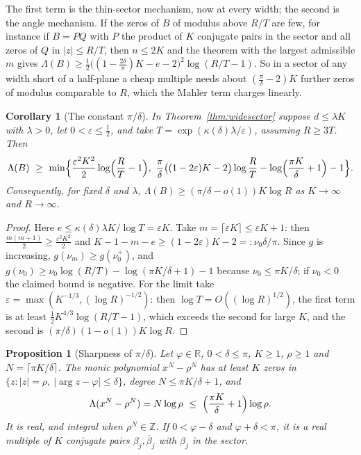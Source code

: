 \documentclass[11pt]{article}
\newtheorem{corollary}[theorem]{Corollary}
\newtheorem{proposition}[theorem]{Proposition}
\newcommand{\R}{\mathbb R}
\begin{document}
The first term is the thin-sector mechanism, now at every width; the second
is the angle mechanism.  If the zeros of $B$ of modulus above $R/T$ are few,
for instance if $B=PQ$ with $P$ the product of $K$ conjugate pairs in the
sector and all zeros of $Q$ in $|z|\le R/T$, then $n\le2K$ and the
theorem with the largest admissible $m$ gives
$\Lambda(B)\ge\frac12\bigl((1-\frac{2\delta}\pi)K-e-2\bigr)^2\log(R/T-1)$.
So in a sector of any
width short of a half-plane a cheap multiple needs about
$(\frac\pi\delta-2)K$ further zeros of modulus comparable to $R$, which the
Mahler term charges linearly.

\begin{corollary}[The constant $\pi/\delta$]\label{cor:wideconst}
In Theorem~\ref{thm:widesector} suppose $d\le\lambda K$ with $\lambda>0$, let
$0<\varepsilon\le\frac12$, and take $T=\exp(\kappa(\delta)\lambda/\varepsilon)$,
assuming $R\ge3T$.  Then
\[
  \Lambda(B)\ \ge\ \min\Bigl\{\frac{\varepsilon^2K^2}2\log\Bigl(\frac RT-1\Bigr),\
  \frac\pi\delta\bigl((1-2\varepsilon)K-2\bigr)\log\frac RT
  -\log\Bigl(\frac{\pi K}\delta+1\Bigr)-1\Bigr\}.
\]
Consequently, for fixed $\delta$ and $\lambda$,
$\Lambda(B)\ge(\pi/\delta-o(1))K\log R$ as $K\to\infty$ and $R\to\infty$.
\end{corollary}

\begin{proof}
Here $e\le\kappa(\delta)\lambda K/\log T=\varepsilon K$.  Take
$m=\lceil\varepsilon K\rceil\le\varepsilon K+1$: then
$\frac{m(m+1)}2\ge\frac{\varepsilon^2K^2}2$ and
$K-1-m-e\ge(1-2\varepsilon)K-2=:\nu_0\delta/\pi$.  Since $g$ is increasing,
$g(\nu_m)\ge g(\nu_0^+)$, and $g(\nu_0)\ge\nu_0\log(R/T)-\log(\pi K/\delta+1)-1$
because $\nu_0\le\pi K/\delta$; if $\nu_0<0$ the claimed bound is negative.
For the limit take $\varepsilon=\max(K^{-1/3},(\log R)^{-1/2})$: then
$\log T=O((\log R)^{1/2})$, the first term is at least
$\frac12K^{4/3}\log(R/T-1)$, which exceeds the second for large $K$, and the second is
$(\pi/\delta)(1-o(1))K\log R$.
\end{proof}

\begin{proposition}[Sharpness of $\pi/\delta$]\label{prop:widesharp}
Let $\varphi\in\R$, $0<\delta\le\pi$, $K\ge1$, $\rho\ge1$ and
$N=\lceil\pi K/\delta\rceil$.  The monic polynomial $x^N-\rho^N$ has at least
$K$ zeros in $\{z:|z|=\rho,\ |\arg z-\varphi|\le\delta\}$, degree
$N\le\pi K/\delta+1$, and
\[
  \Lambda(x^N-\rho^N)=N\log\rho\ \le\ \Bigl(\frac{\pi K}\delta+1\Bigr)\log\rho .
\]
It is real, and integral when $\rho^N\in\mathbb Z$.  If $0<\varphi-\delta$
and $\varphi+\delta<\pi$, it is a real multiple of $K$ conjugate pairs
$\beta_j,\bar\beta_j$ with $\beta_j$ in the sector.
\end{proposition}
\end{document}

